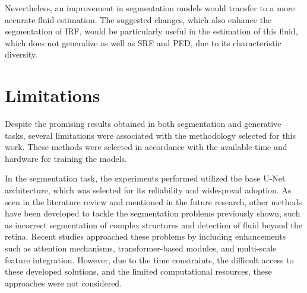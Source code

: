 \par
Nevertheless, an improvement in segmentation models would transfer to a more accurate fluid estimation. The suggested changes, which also enhance the segmentation of IRF, would be particularly useful in the estimation of this fluid, which does not generalize as well as SRF and PED, due to its characteristic diversity.

\section{Limitations}
Despite the promising results obtained in both segmentation and generative tasks, several limitations were associated with the methodology selected for this work. These methods were selected in accordance with the available time and hardware for training the models.
\par
In the segmentation task, the experiments performed utilized the base U-Net architecture, which was selected for its reliability and widespread adoption. As seen in the literature review and mentioned in the future research, other methods have been developed to tackle the segmentation problems previously shown, such as incorrect segmentation of complex structures and detection of fluid beyond the retina. Recent studies approached these problems by including enhancements such as attention mechanisms, transformer-based modules, and multi-scale feature integration. However, due to the time constraints, the difficult access to these developed solutions, and the limited computational resources, these approaches were not considered.
\par
